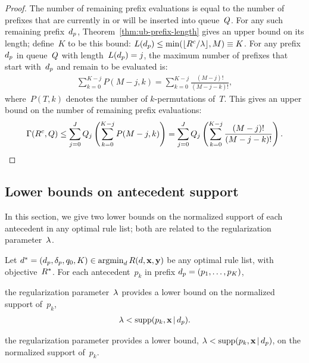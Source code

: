\begin{arxiv}
\begin{proof}
The number of remaining prefix evaluations is equal to the number of
prefixes that are currently in or will be inserted into queue~$Q$.
%
For any such remaining prefix~$d_p$,
Theorem~\ref{thm:ub-prefix-length} gives an upper bound on its length;
define~$K$ to be this bound:
${L(d_p) \le \min(\lfloor {R^c} / {\lambda} \rfloor, M) \equiv K}$.
%
For any prefix~$d_p$ in queue~$Q$ with length~${L(d_p) = j}$,
the maximum number of prefixes that start with~$d_p$
and remain to be evaluated is:
\begin{align}
\sum_{k=0}^{K-j} P(M-j, k) = \sum_{k=0}^{K-j} \frac{(M-j)!}{(M-j - k)!},
\end{align}
where~${P(T, k)}$ denotes the number of $k$-permutations of~$T$.
%
This gives an upper bound on the number of remaining prefix evaluations:
\begin{align}
\Gamma({R^c}, Q)
\le \sum_{j=0}^J Q_j \left( \sum_{k=0}^{K-j} P(M-j, k) \right)
= \sum_{j=0}^J Q_j \left( \sum_{k=0}^{K-j} \frac{(M-j)!}{(M-j - k)!} \right).
\end{align}
\end{proof}
\end{arxiv}

\subsection{Lower bounds on antecedent support}
\label{sec:lb-support}

In this section, we give two lower bounds on the normalized support
of each antecedent in any optimal rule list;
both are related to the regularization parameter~${\lambda}$.

\begin{theorem}
\label{thm:min-capture}
Let ${d^* = (d_p, \delta_p, q_0, K) \in \operatorname*{argmin}_{d} R({d}, \mathbf{x}, \mathbf{y})}$
be any optimal rule list, with objective~$R^*$.
%
For each antecedent~$p_k$ in prefix ${d_p = (p_1, \dots, p_K)}$,
\begin{arxiv}
the regularization parameter~${\lambda}$ provides a lower bound
on the normalized support of~$p_k$,
\begin{align}
{\lambda} < \textnormal{supp}(p_k, \mathbf{x} \,|\, d_p).
\label{eq:min-capture}
\end{align}
\end{arxiv}
\begin{kdd}
the regularization parameter provides a lower bound,
${{\lambda} < \textnormal{supp}(p_k, \mathbf{x} \,|\, d_p)}$, on the normalized support of~$p_k$.
\end{kdd}
\end{theorem}

